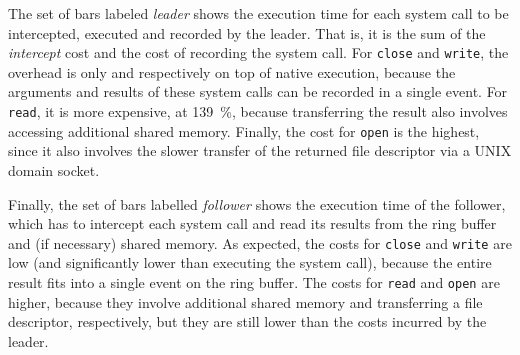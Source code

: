 The set of bars labeled \textit{leader} shows the execution time for
each system call to be intercepted, executed and recorded by the
leader.  That is, it is the sum of the \textit{intercept} cost and the
cost of recording the system call.  For \lstinline`close` and \lstinline`write`,
the overhead is only \closeLeaderOvh and \writeLeaderOvh respectively
on top of native execution, because the arguments and results of
these system calls can be recorded in a single event.  For \lstinline`read`,
it is more expensive, at \SI{139}{\percent}, because transferring the result also
involves accessing additional shared memory.  Finally, the cost for
\lstinline`open` is the highest, since it also involves the slower transfer
of the returned file descriptor via a UNIX domain socket.

Finally, the set of bars labelled \textit{follower} shows the execution
time of the follower, which has to intercept each system call and read
its results from the ring buffer and (if necessary) shared memory.  As
expected, the costs for \lstinline`close` and \lstinline`write` are low (and
significantly lower than executing the system call), because the
entire result fits into a single event on the ring buffer. The costs
for \lstinline`read` and \lstinline`open` are higher, because they involve
additional shared memory and transferring a file descriptor,
respectively, but they are still lower than the costs incurred by the
leader.




